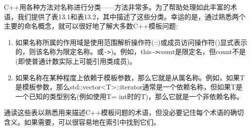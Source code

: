 C++用各种方法对名称进行分类——方法非常多。为了帮助处理如此丰富的术语，我们提供了表13.1和表13.2，其中描述了这些分类。幸运的是，通过熟悉两个主要的命名概念，就可以很好地了解大多数C++模板问题:

\begin{enumerate}
\item 
如果名称所属的作用域是使用范围解析操作符(::)或成员访问操作符()显式表示的，则该名称为限定名称。或\texttt{->})。例如，this\texttt{->}count是限定名，但count不是(即使普通计数实际上可能引用类成员)。

\item 
如果名称在某种程度上依赖于模板参数，那么它就是从属名称。例如，如果T是模板参数，那么std::vector<T>::iterator通常是一个依赖名称，但如果T是一个已知的类型别名(例如使用T= int时的T)，那么它就是一个非依赖名称。
\end{enumerate}

通读这些表以熟悉用来描述C++模板问题的术语，但没必要记住每个术语的确切含义。如果需要，可以很容易地在索引中找到它们。

